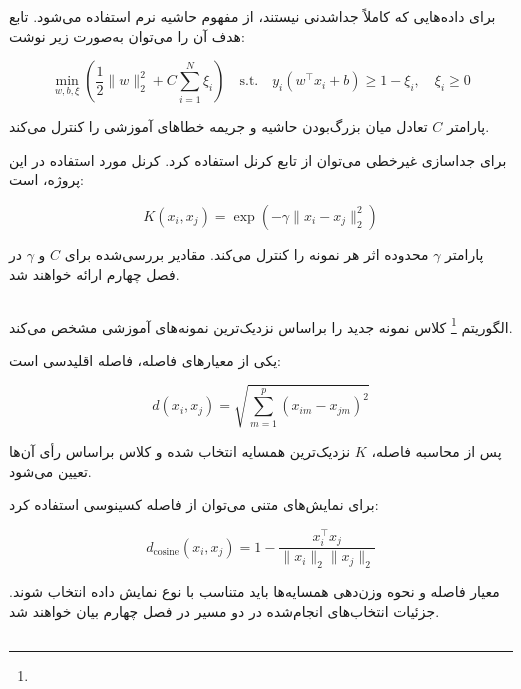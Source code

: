 برای داده‌هایی که کاملاً جداشدنی نیستند، از مفهوم حاشیه نرم استفاده می‌شود. تابع هدف آن را می‌توان به‌صورت زیر نوشت:

\begin{equation}
\min_{w,b,\xi}
\left(
\frac{1}{2}\|w\|_2^2
+
C\sum_{i=1}^{N}\xi_i
\right)
\quad
\text{s.t.}
\quad
y_i(w^\top x_i+b)\geq 1-\xi_i,
\quad
\xi_i\geq 0
\end{equation}

پارامتر $C$ تعادل میان بزرگ‌بودن حاشیه و جریمه خطاهای آموزشی را کنترل می‌کند.

برای جداسازی غیرخطی می‌توان از تابع کرنل استفاده کرد. کرنل مورد استفاده در این پروژه،
است:

\begin{equation}
K(x_i,x_j)
=
\exp
\left(
-\gamma
\|x_i-x_j\|_2^2
\right)
\end{equation}

پارامتر $\gamma$ محدوده اثر هر نمونه را کنترل می‌کند. مقادیر بررسی‌شده برای $C$ و $\gamma$ در فصل چهارم ارائه خواهند شد.


\subsection{}

الگوریتم
\footnote{}
کلاس نمونه جدید را براساس نزدیک‌ترین نمونه‌های آموزشی مشخص می‌کند.

یکی از معیارهای فاصله، فاصله اقلیدسی است:

\begin{equation}
d(x_i,x_j)
=
\sqrt{
\sum_{m=1}^{p}
(x_{im}-x_{jm})^2
}
\end{equation}

پس از محاسبه فاصله، $K$ نزدیک‌ترین همسایه انتخاب شده و کلاس براساس رأی آن‌ها تعیین می‌شود.

برای نمایش‌های متنی می‌توان از فاصله کسینوسی استفاده کرد:

\begin{equation}
d_{\mathrm{cosine}}(x_i,x_j)
=
1-
\frac{x_i^\top x_j}{\|x_i\|_2\|x_j\|_2}
\end{equation}

معیار فاصله و نحوه وزن‌دهی همسایه‌ها باید متناسب با نوع نمایش داده انتخاب شوند. جزئیات انتخاب‌های انجام‌شده در دو مسیر در فصل چهارم بیان خواهند شد.


\subsection{}

